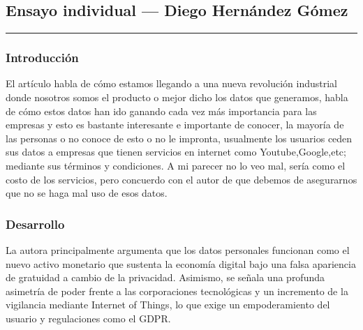 %

\subsection*{Ensayo individual — Diego Hernández Gómez}

\vspace{0.3cm}

\noindent
\textcolor{unamblue}{\rule{\textwidth}{1.2pt}}

\vspace{0.3cm}

\subsubsection*{\textcolor{unamblue}{Introducción}}

El artículo habla de cómo estamos llegando a una nueva revolución industrial donde nosotros somos el producto o mejor dicho los datos que generamos, habla de cómo estos datos han ido ganando cada vez más importancia para las empresas y esto es bastante interesante e importante de conocer, la mayoría de las personas o no conoce de esto o no le impronta, usualmente los usuarios ceden sus datos a empresas que tienen servicios en internet como Youtube,Google,etc; mediante sus términos y condiciones. A mi parecer no lo veo mal, sería como el costo de los servicios, pero concuerdo con el autor de que debemos de asegurarnos que no se haga mal uso de esos datos.

\vspace{0.1cm}

\subsubsection*{\textcolor{unamblue}{Desarrollo}}

La autora principalmente argumenta que los datos personales funcionan como el nuevo activo monetario que sustenta la economía digital bajo una falsa apariencia de gratuidad a cambio de la privacidad. Asimismo, se señala una profunda asimetría de poder frente a las corporaciones tecnológicas y un incremento de la vigilancia mediante Internet of Things, lo que exige un empoderamiento del usuario y regulaciones como el GDPR. 

